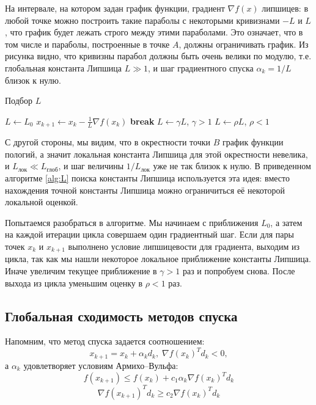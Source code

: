 \documentclass[a4paper, 12pt]{article}
\begin{document}
На интервале, на котором задан график функции, градиент $\nabla f(x)$ липшицев: в любой точке можно построить такие параболы с некоторыми кривизнами $-L$ и $L$, что график будет лежать строго между этими параболами. Это означает, что в том числе и параболы, построенные в точке $A$, должны ограничивать график. Из рисунка видно, что кривизны парабол должны быть очень велики по модулю, т.е. глобальная константа Липшица $L \gg 1$, и шаг градиентного спуска $\alpha_k = 1 / L$ близок к нулю.

\begin{algorithm}
\caption{Подбор $L$}\label{alg:L}
\begin{algorithmic}[1]
\State $L \gets L_0$
\Loop
    \State $x_{k+1} \gets x_k - \frac{1}{L} \nabla f(x_k)$
     \Then
    \State\textbf{break}
    \EndIf
    \State $L \gets \gamma L$, $\gamma > 1$
\EndLoop
\State $L \gets \rho L$, $\rho < 1$
\end{algorithmic}
\end{algorithm}

С другой стороны, мы видим, что в окрестности точки $B$ график функции пологий, а значит локальная константа Липшица для этой окрестности невелика, и $L_{\text{лок}} \ll L_{\text{глоб}}$, и шаг величины $1/L_{\text{лок}}$ уже не так близок к нулю. В приведенном алгоритме \ref{alg:L} поиска константы Липшица используется эта идея: вместо нахождения точной константы Липшица можно ограничиться её некоторой локальной оценкой.

Попытаемся разобраться в алгоритме. Мы начинаем с приближения $L_0$, а затем на каждой итерации цикла совершаем один градиентный шаг. Если для пары точек $x_{k}$ и $x_{k+1}$ выполнено условие липшицевости для градиента, выходим из цикла, так как мы нашли некоторое локальное приближение константы Липшица. Иначе увеличим текущее приближение в $\gamma > 1$ раз и попробуем снова. После выхода из цикла уменьшим оценку в $\rho < 1$ раз.

\subsection{Глобальная сходимость методов спуска}
Напомним, что метод спуска задается соотношением:
$$x_{k + 1} = x_k + \alpha_k d_k, \; \nabla f(x_k)^T d_k < 0,$$
а $\alpha_k$ удовлетворяет условиям Армихо--Вульфа:
\begin{equation}
    f(x_{k+1}) \leq f(x_k) + c_1 \alpha_k \nabla f(x_k)^T d_k \label{armijo}
\end{equation}
\begin{equation}
    \nabla f(x_{k+1})^T d_k \geq c_2 \nabla f(x_k)^T d_k \label{wolfe}
\end{equation}
\end{document}
